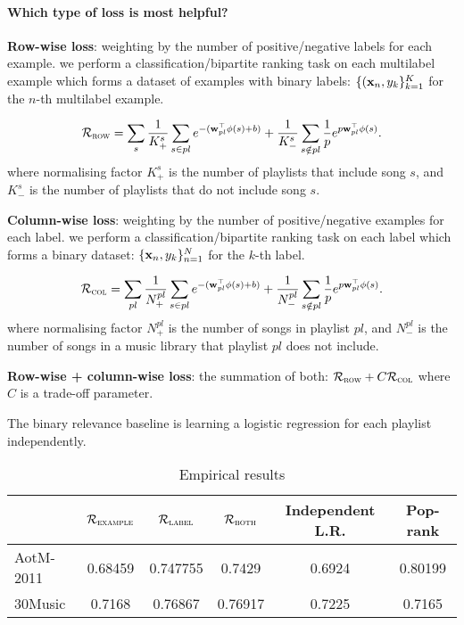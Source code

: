 \paragraph{Which type of loss is most helpful?}

{\bf Row-wise loss}: weighting by the number of positive/negative labels for each example.
\ie we perform a classification/bipartite ranking task on each multilabel example 
which forms a dataset of examples with binary labels: $\{(\mathbf{x}_n, y_k\}_{k=1}^K$ for the $n$-th multilabel example.

\begin{equation*}
\mathcal{R}_\textsc{row} 
= \displaystyle \sum_s 
  \frac{1}{K_+^s} \sum_{s \in pl} e^{-(\mathbf{w}_{pl}^\top \phi(s) + b)} +
  \frac{1}{K_-^s} \sum_{s \notin pl} \frac{1}{p} e^{p \mathbf{w}_{pl}^\top \phi(s)}.
\end{equation*}
where normalising factor $K_+^s$ is the number of playlists that include song $s$,
and $K_-^s$ is the number of playlists that do not include song $s$.


{\bf Column-wise loss}: weighting by the number of positive/negative examples for each label.
\ie we perform a classification/bipartite ranking task on each label which forms a binary dataset:
$\{\mathbf{x}_n, y_k\}_{n=1}^N$ for the $k$-th label.

\begin{equation*}
\mathcal{R}_\textsc{col} 
= \displaystyle \sum_{pl}
  \frac{1}{N_+^{pl}} \sum_{s \in pl} e^{-(\mathbf{w}_{pl}^\top \phi(s) + b)} +
  \frac{1}{N_-^{pl}} \sum_{s \notin pl} \frac{1}{p} e^{p \mathbf{w}_{pl}^\top \phi(s)}.
\end{equation*}
where normalising factor $N_+^{pl}$ is the number of songs in playlist $pl$,
and $N_-^{pl}$ is the number of songs in a music library that playlist $pl$ does not include.


{\bf Row-wise + column-wise loss}: the summation of both: $\mathcal{R}_\textsc{row} + C \mathcal{R}_\textsc{col}$ 
where $C$ is a trade-off parameter.

The binary relevance baseline is learning a logistic regression for each playlist independently.


\begin{table}[!h]
\centering
\caption{Empirical results}
\begin{tabular}{l|ccccc}
\toprule
{}            & $\mathcal{R}_\textsc{example}$ & $\mathcal{R}_\textsc{label}$ & $\mathcal{R}_\textsc{both}$ & Independent L.R. & Pop-rank \\
\midrule
AotM-2011     & 0.68459 & 0.747755 & 0.7429  & 0.6924 & 0.80199 \\
30Music       & 0.7168  & 0.76867  & 0.76917 & 0.7225 & 0.7165 \\
\bottomrule
\end{tabular}
\end{table}

